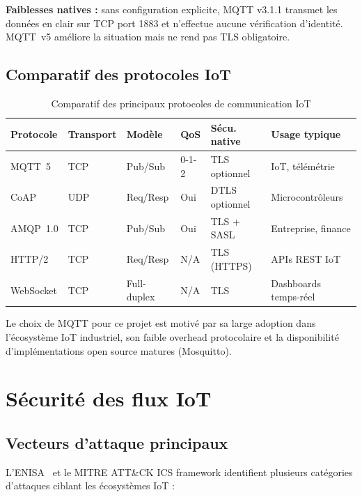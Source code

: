 \textbf{Faiblesses natives :} sans configuration explicite, MQTT v3.1.1 transmet les données en clair sur TCP port 1883 et n'effectue aucune vérification d'identité. MQTT~v5 améliore la situation mais ne rend pas TLS obligatoire.

\subsection{Comparatif des protocoles IoT}

\begin{table}[H]
\centering
\caption{Comparatif des principaux protocoles de communication IoT}
\label{tab:protocoles_iot}
\begin{tabular}{lllllp{3.2cm}}
\toprule
\textbf{Protocole} & \textbf{Transport} & \textbf{Modèle} & \textbf{QoS} & \textbf{Sécu. native} & \textbf{Usage typique} \\
\midrule
MQTT~5 & TCP & Pub/Sub & 0-1-2 & TLS optionnel & IoT, télémétrie \\
CoAP & UDP & Req/Resp & Oui & DTLS optionnel & Microcontrôleurs \\
AMQP~1.0 & TCP & Pub/Sub & Oui & TLS + SASL & Entreprise, finance \\
HTTP/2 & TCP & Req/Resp & N/A & TLS (HTTPS) & APIs REST IoT \\
WebSocket & TCP & Full-duplex & N/A & TLS & Dashboards temps-réel \\
\bottomrule
\end{tabular}
\end{table}

Le choix de MQTT pour ce projet est motivé par sa large adoption dans l'écosystème IoT industriel, son faible overhead protocolaire et la disponibilité d'implémentations open source matures (Mosquitto).

\section{Sécurité des flux IoT}

\subsection{Vecteurs d'attaque principaux}

L'ENISA~\cite{enisa_iot} et le MITRE ATT\&CK ICS framework identifient plusieurs catégories d'attaques ciblant les écosystèmes IoT :


